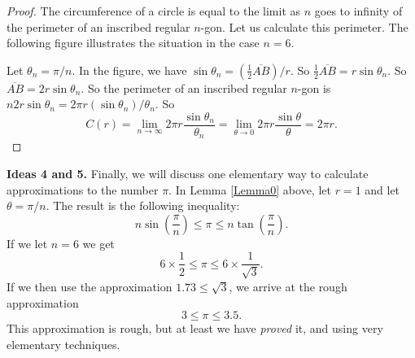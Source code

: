 \documentclass[twoside,twocolumn,12pt]{amsart}
\theoremstyle{plain}
\theoremstyle{definition}
\begin{document}
\begin{proof}
The circumference of a circle is equal to the limit as $n$ goes to infinity
of the perimeter of an inscribed regular $n$-gon. Let us calculate this
perimeter. The following figure illustrates the situation in the case $n=6$.

\mbox{}

Let $\theta_n=\pi/n$. In the figure, we have
$\sin\theta_n= (\frac{1}{2}\overline{AB})/r$.
So $\frac{1}{2}\overline{AB}=r\sin\theta_n$.
So $\overline{AB}=2r\sin\theta_n$.
So the perimeter of an inscribed regular $n$-gon is
$n2r\sin\theta_n=2\pi r(\sin\theta_n)/\theta_n$. So
$$C(r)=\lim_{n\to\infty}2\pi r\frac{\sin\theta_n}{\theta_n}
=\lim_{\theta\to 0}2\pi r\frac{\sin\theta}{\theta}=2\pi r.$$
\end{proof}

\vspace{0.2in}

\noindent
\textbf{Ideas 4 and 5.} Finally,
we will discuss one elementary way to calculate
approximations to the number $\pi$. In Lemma \ref{Lemma0} above, let
$r=1$ and let $\theta=\pi/n$. The result is the following inequality:
\begin{equation}
\label{PiBounds}
 n\sin\left(\frac{\pi}{n}\right)\leq\pi\leq
n\tan\left(\frac{\pi}{n}\right).
\end{equation}
If we let $n=6$ we get
$$6\times\frac{1}{2}\leq\pi\leq 6\times\frac{1}{\sqrt{3}}.$$
If we then use the approximation $1.73\leq\sqrt{3}$, we arrive at the rough
approximation
$$3\leq\pi\leq 3.5.$$
This approximation is rough, but at least we have \emph{proved} it,
and using very elementary techniques.
\end{document}
